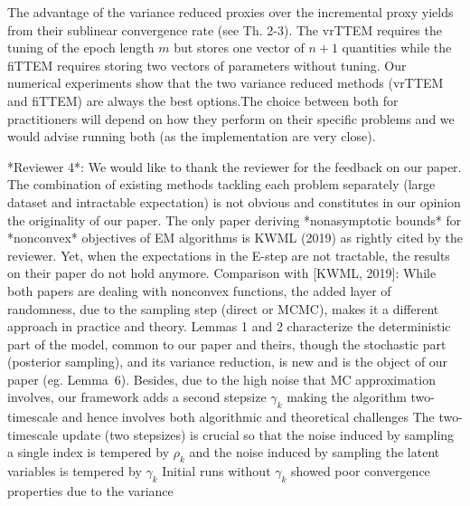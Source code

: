 \documentclass[anon,12pt]{alt2021} %
\begin{document}
The advantage of the variance reduced proxies over the incremental proxy yields from their sublinear convergence rate (see Th. 2-3). 
The vrTTEM requires the tuning of the epoch length $m$ but stores one vector of $n+1$ quantities while the fiTTEM requires storing two vectors of parameters without tuning.
Our numerical experiments show that the two variance reduced methods (vrTTEM and fiTTEM) are always the best options.The choice between both for practitioners will depend on how they perform on their specific problems and we would advise running both (as the implementation are very close).

*Reviewer 4*: 
We would like to thank the reviewer for the feedback on our paper. 
The combination of existing methods tackling each problem separately (large dataset and intractable expectation) is not obvious and constitutes in our opinion the originality of our paper.
The only paper deriving *nonasymptotic bounds* for *nonconvex* objectives of EM algorithms is KWML (2019) as rightly cited by the reviewer.
Yet, when the expectations in the E-step are not tractable, the results on their paper do not hold anymore.
Comparison with [KWML, 2019]: While both papers are dealing with nonconvex functions, the added layer of randomness, due to the sampling step (direct or MCMC), makes it a different approach in practice and theory.
Lemmas 1 and 2 characterize the deterministic part of the model, common to our paper and theirs, though the stochastic part (posterior sampling), and its variance reduction, is new and is the object of our paper (eg. Lemma~6).
Besides, due to the high noise that MC approximation involves, our framework adds a second stepsize $\gamma_k$ making the algorithm two-timescale and hence involves both algorithmic and theoretical challenges
The two-timescale update (two stepsizes) is crucial so that the noise induced by sampling a single index is tempered by $\rho_k$ and the noise induced by sampling the latent variables is tempered by $\gamma_k$ Initial runs without $\gamma_k$ showed poor convergence properties due to the variance
\end{document}
